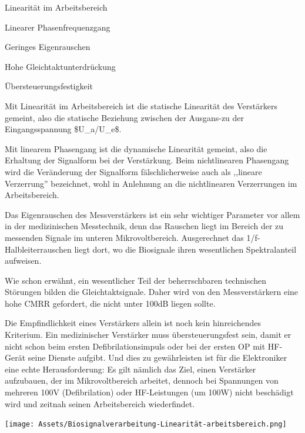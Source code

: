\documentclass[a4paper]{article}
\begin{document}
\begin{multicols}{3}
  \begin{itemize*}
    \item Linearität im Arbeitsbereich
    \item Linearer Phasenfrequenzgang
    \item Geringes Eigenrauschen
    \item Hohe Gleichtaktunterdrückung
    \item Übersteuerungsfestigkeit
  \end{itemize*}

  \begin{enumerate*}
    \def\labelenumi{\arabic{enumi}.}
    \item Mit Linearität im Arbeitsbereich ist die statische Linearität des Verstärkers gemeint, also die statische Beziehung zwischen der Ausgans-zu der Eingangsspannung \$U\_a/U\_e\$.
    \item Mit linearem Phasengang ist die dynamische Linearität gemeint, also die Erhaltung der Signalform bei der Verstärkung. Beim nichtlinearen Phasengang wird die Veränderung der Signalform fälschlicherweise auch als ,,lineare Verzerrung'' bezeichnet, wohl in Anlehnung an die nichtlinearen Verzerrungen im Arbeitsbereich.
    \item Das Eigenrauschen des Messverstärkers ist ein sehr wichtiger Parameter vor allem in der medizinischen Messtechnik, denn das Rauschen liegt im Bereich der zu messenden Signale im unteren Mikrovoltbereich. Ausgerechnet das 1/f-Halbleiterrauschen liegt dort, wo die Biosignale ihren wesentlichen Spektralanteil aufweisen.
    \item Wie schon erwähnt, ein wesentlicher Teil der beherrschbaren technischen Störungen bilden die Gleichtaktsignale. Daher wird von den Messverstärkern eine hohe CMRR gefordert, die nicht unter 100dB liegen sollte.
    \item Die Empfindlichkeit eines Verstärkers allein ist noch kein hinreichendes Kriterium. Ein medizinischer Verstärker muss übersteuerungsfest sein, damit er nicht schon beim ersten Defibrilationsimpuls oder bei der ersten OP mit HF-Gerät seine Dienste aufgibt. Und dies zu gewährleisten ist für die Elektroniker eine echte Herausforderung: Es gilt nämlich das Ziel, einen Verstärker aufzubauen, der im Mikrovoltbereich arbeitet, dennoch bei Spannungen von mehreren 100V (Defibrilation) oder HF-Leistungen (um 100W) nicht beschädigt wird und zeitnah seinen Arbeitsbereich wiederfindet.
  \end{enumerate*}

  \texttt{[image: Assets/Biosignalverarbeitung-Linearität-arbeitsbereich.png]}


\end{multicols}
\end{document}
